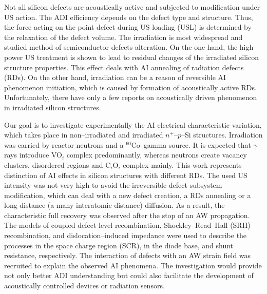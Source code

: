\documentclass[aip,jap, amsmath,amssymb,reprint]{revtex4-1}
\begin{document}
Not all silicon defects are acoustically active and subjected to modification under US action.
The ADI efficiency depends on the defect type and structure. \cite{UST:Medvid}
Thus, the force acting on the point defect during US loading (USL) is determined by the relaxation of the defect volume\cite{MirzadeJAP2011,PeleshchakUJF2016}.
The irradiation is most widespread and studied method of semiconductor defects alteration.
On the one hand, the high--power US treatment is shown\cite{YOlikh2007TPL,Parchinskii2006,Gorb2010,Podolian2012} to lead to residual changes of the irradiated silicon structure properties.
This effect deals with AI annealing of radiation defects (RDs).
On the other hand, irradiation can be a reason of reversible AI phenomenon initiation, \cite{YOlikh2006TPL,YOlikhTPL2011} which is caused by formation of acoustically active RDs.
Unfortunately, there have only a few reports on acoustically driven phenomenon in irradiated silicon structures.


Our goal is to investigate experimentally the AI electrical characteristic variation, which takes place in non--irradiated and irradiated $n^+$--$p$--Si structures.
Irradiation was carried by reactor neutrons and a $^{60}$Co--gamma source.
It is expected that $\gamma$--rays introduce
VO$_i$ complex predominantly,
\cite{NIEL:Jafari,Gamma:Prabhakara,NIEL:Moll}
whereas neutrons create vacancy clusters, \cite{Rew:Srour,Pintilie} disordered regions \cite{Neutron:Arutyunov} and C$_i$O$_i$ complex  \cite{NIEL:Moll,neutron:Londos} mainly.
This work represents distinction of AI effects in silicon structures with different RDs.
The used US intensity was not very high
to avoid the irreversible defect subsystem modification,
which can deal with a new defect creation, a RDs annealing or a long distance (a many interatomic distance) diffusion.
As a result, the characteristic full recovery was observed after the stop of an AW propagation.
The models of coupled defect level recombination, \cite{CDLR:JAP1995,CDLR:JAP} Shockley--Read--Hall (SRH) recombination, and dislocation--induced impedance \cite{Rsh:Gopal2003,Rsh:Gopal2004} were used to describe the processes in the space charge region (SCR),  in the diode base, and shunt resistance, respectively.
The interaction of defects with an AW strain field \cite{MirzadeJAP2011,PeleshchakUJF2016} was recruited to explain the observed AI phenomena.
The investigation would provide not only better ADI understanding but could also facilitate the development of acoustically controlled devices or radiation sensors.
\end{document}
